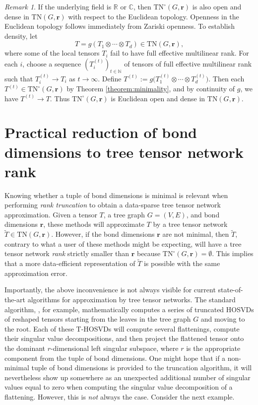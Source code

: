 \documentclass{amsart}
\theoremstyle{plain}
\theoremstyle{definition}
\theoremstyle{remark}
\newtheorem{remark}[theorem]{Remark}
\begin{document}
\begin{remark}
If the underlying field is $\mathbb{R}$ or $\mathbb{C}$, then $\mathrm{TN}^\circ(G,\mathbf{r})$ is also open and dense in $\mathrm{TN}(G,\mathbf{r})$ with respect to the Euclidean topology. Openness in the Euclidean topology follows immediately from Zariski openness. To establish density, let
\[
T = g(T_1 \otimes \cdots \otimes T_d) \in \mathrm{TN}(G,\mathbf{r}),
\]
where some of the local tensors $T_i$ fail to have full effective multilinear rank. For each $i$, choose a sequence $(T_i^{(t)})_{t \in \mathbb{N}}$ of tensors of full effective multilinear rank such that $T_i^{(t)} \to T_i$ as $t \to \infty$. Define 
\(
T^{(t)} := g\bigl(T_1^{(t)} \otimes \cdots \otimes T_d^{(t)}\bigr).
\)
Then each $T^{(t)} \in \mathrm{TN}^\circ(G,\mathbf{r})$ by Theorem \ref{theorem:minimality}, and by continuity of $g$, we have $T^{(t)} \to T$. Thus $\mathrm{TN}^\circ(G,\mathbf{r})$ is Euclidean open and dense in $\mathrm{TN}(G,\mathbf{r})$.
\end{remark}

\section{Practical reduction of bond dimensions to tree tensor network rank}\label{sec:practical}
Knowing whether a tuple of bond dimensions is minimal is relevant when performing \emph{rank truncation} to obtain a data-sparse tree tensor network approximation. Given a tensor $T$, a tree graph $G=(V,E)$, and bond dimensions $\mathbf{r}$, these methods will approximate $T$ by a tree tensor network $\widetilde{T} \in \mathrm{TN}(G, \mathbf{r})$. However, if the bond dimensions $\mathbf{r}$ are not minimal, then $\widetilde{T}$, contrary to what a user of these methods might be expecting, will have a tree tensor network \emph{rank} strictly smaller than $\mathbf{r}$ because $\mathrm{TN}^\circ(G, \mathbf{r}) = \emptyset$. This implies that a more data-efficient representation of $\widetilde{T}$ is possible with the same approximation error. 

Importantly, the above inconvenience is not always visible for current state-of-the-art algorithms for approximation by tree tensor networks. The standard algorithm, \cite[Algorithm 2]{grasedyck}, for example, mathematically computes a series of truncated HOSVDs \cite{DeLathauwerEtAl} of reshaped tensors starting from the leaves in the tree graph $G$ and moving to the root. Each of these T-HOSVDs will compute several flattenings, compute their singular value decompositions, and then project the flattened tensor onto the dominant $r$-dimensional left singular subspace, where $r$ is the appropriate component from the tuple of bond dimensions. One might hope that if a non-minimal tuple of bond dimensions is provided to the truncation algorithm, it will nevertheless show up somewhere as an unexpected additional number of singular values equal to zero when computing the singular value decomposition of a flattening. However, this is \emph{not} always the case. Consider the next example.
\end{document}
